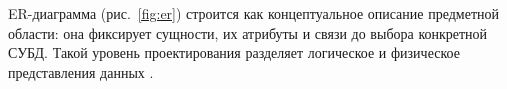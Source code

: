 ER-диаграмма (рис.~\ref{fig:er}) строится как концептуальное описание предметной области:
она фиксирует сущности, их атрибуты и связи до выбора конкретной СУБД. Такой
уровень проектирования разделяет логическое и физическое
представления данных \cite{db_lectures}.


\FloatBarrier

